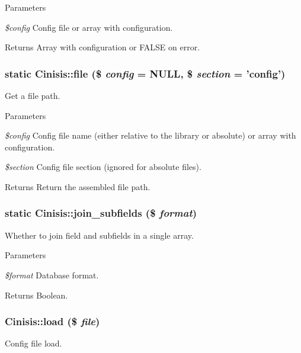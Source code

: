 \begin{DoxyParams}{Parameters}
\item[{\em \$config}]Config file or array with configuration.\end{DoxyParams}
\begin{DoxyReturn}{Returns}
Array with configuration or FALSE on error. 
\end{DoxyReturn}
\hypertarget{classCinisis_aac686f5d4862085721eb0de1d6203a57}{
\subsubsection[{file}]{\setlength{\rightskip}{0pt plus 5cm}static Cinisis::file (\$ {\em config} = {\ttfamily NULL}, \/  \$ {\em section} = {\ttfamily 'config'})}}
\label{classCinisis_aac686f5d4862085721eb0de1d6203a57}
Get a file path.


\begin{DoxyParams}{Parameters}
\item[{\em \$config}]Config file name (either relative to the library or absolute) or array with configuration.\item[{\em \$section}]Config file section (ignored for absolute files).\end{DoxyParams}
\begin{DoxyReturn}{Returns}
Return the assembled file path. 
\end{DoxyReturn}
\hypertarget{classCinisis_a0163d3358b31657bd6e91f94aa618918}{
\subsubsection[{join\_\-subfields}]{\setlength{\rightskip}{0pt plus 5cm}static Cinisis::join\_\-subfields (\$ {\em format})}}
\label{classCinisis_a0163d3358b31657bd6e91f94aa618918}
Whether to join field and subfields in a single array.


\begin{DoxyParams}{Parameters}
\item[{\em \$format}]Database format.\end{DoxyParams}
\begin{DoxyReturn}{Returns}
Boolean. 
\end{DoxyReturn}
\hypertarget{classCinisis_a0bd044303b01793f1a59c54040ff0242}{
\subsubsection[{load}]{\setlength{\rightskip}{0pt plus 5cm}Cinisis::load (\$ {\em file})}}
\label{classCinisis_a0bd044303b01793f1a59c54040ff0242}
Config file load.


